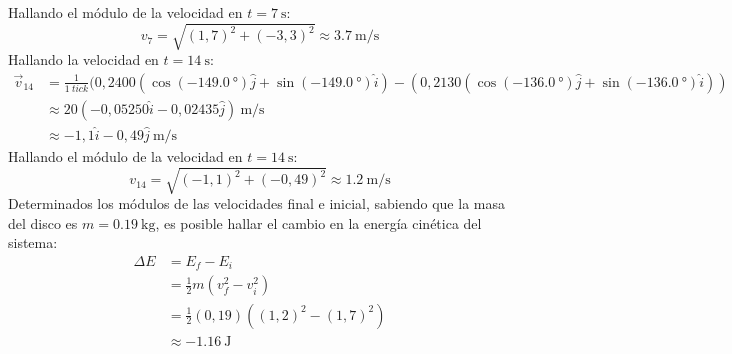\documentclass[../main.tex]{subfiles}
\begin{document}
Hallando el módulo de la velocidad en $t = \qty{7}{\second}$:
\begin{equation*}
  v_7 = \sqrt{(1,7)^2 + (-3,3)^2} \approx \qty{3,7}{\metre\per\second}
\end{equation*}
Hallando la velocidad en $t = \qty{14}{\second}$:
\begin{align*}
  \vec{v}_14 &= \frac{1}{\qty{1}{tick}}
  (0,2400(\cos{(\qty{-149,0}{\degree})}\hat{j} + \sin{(\qty{-149,0}{\degree})}\hat{i}) -
  (0,2130(\cos{(\qty{-136,0}{\degree})}\hat{j} + \sin{(\qty{-136,0}{\degree})}\hat{i})) \\
  &\approx 20(-0,05250 \hat{i} - 0,02435 \hat{j})\ \unit{\metre\per\second} \\
  &\approx -1,1 \hat{i} - 0,49 \hat{j}\ \unit{\metre\per\second}
\end{align*}
Hallando el módulo de la velocidad en $t = \qty{14}{\second}$:
\begin{equation*}
  v_14 = \sqrt{(-1,1)^2 + (-0,49)^2} \approx \qty{1,2}{\metre\per\second}
\end{equation*}
Determinados los módulos de las velocidades final e inicial, sabiendo que la masa del disco es $m = \qty{0,19}{\kilo\gram}$, es posible hallar el cambio en la energía cinética del sistema:
\begin{align*}
  \Delta E &= E_f - E_i \\
  &= \frac{1}{2}m(v_f^2 - v_i^2) \\
  &= \frac{1}{2}(0,19)((1,2)^2 - (1,7)^2) \\
  &\approx \qty{-1,16}{\joule}
\end{align*}
\end{document}
